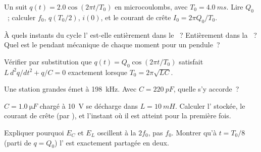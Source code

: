 \begin{exercise}[$\star$]\label{exo:g12:rlc-oscillations:4}
Un  suit
$q(t) = 2.0\cos(2\pi t/T_0)$ en microcoulombs, avec
$T_0 = \qty{4.0}{ms}$. Lire $Q_0$~; calculer $f_0$, $q(T_0/2)$,
$i(0)$, et le courant de crête $I_0 = 2\pi Q_0/T_0$.
\end{exercise}

\begin{exercise}[$\star$]\label{exo:g12:rlc-oscillations:5}
À quels instants du cycle l' est-elle
entièrement dans le ~? Entièrement dans la
~? Quel est le pendant mécanique de chaque
moment pour un pendule~?
\end{exercise}

\begin{exercise}[$\star\star$]\label{exo:g12:rlc-oscillations:6}
Vérifier par substitution que $q(t) = Q_0\cos(2\pi t/T_0)$ satisfait
$L\,d^2q/dt^2 + q/C = 0$ exactement lorsque $T_0 = 2\pi\sqrt{LC}$.
\end{exercise}

\begin{exercise}[$\star\star$]\label{exo:g12:rlc-oscillations:7}
Une station grandes  émet à \qty{198}{kHz}. Avec
$C = \qty{220}{pF}$, quelle  s'y accorde~?
\end{exercise}

\begin{exercise}[$\star\star$]\label{exo:g12:rlc-oscillations:8}
$C = \qty{1.0}{\micro F}$ chargé à \qty{10}{V} se décharge dans
$L = \qty{10}{mH}$. Calculer l' stockée, le
courant de crête (par ), et l'instant où il est atteint pour
la première fois.
\end{exercise}

\begin{exercise}[$\star\star$]\label{exo:g12:rlc-oscillations:9}
Expliquer pourquoi $E_C$ et $E_L$ oscillent à la
 $2f_0$, pas $f_0$. Montrer qu'à
$t = T_0/8$ (parti de $q = Q_0$) l' est
exactement partagée en deux.
\end{exercise}

